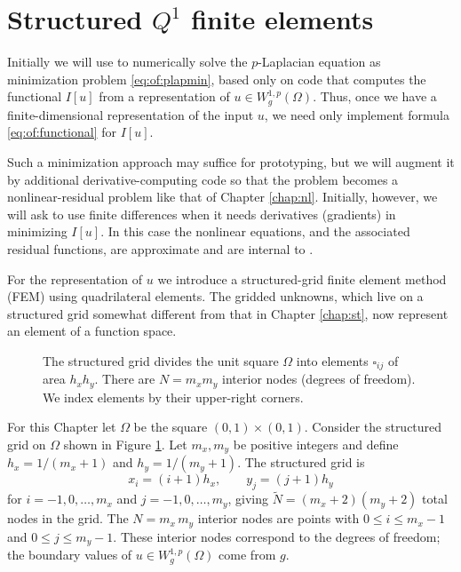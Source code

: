 \section{Structured $Q^1$ finite elements}

Initially we will use \PETSc to numerically solve the $p$-Laplacian equation as minimization problem \eqref{eq:of:plapmin}, based only on code that computes the functional $I[u]$ from a representation of $u \in W_g^{1,p}(\Omega)$.  Thus, once we have a finite-dimensional representation of the input $u$, we need only implement formula \eqref{eq:of:functional} for $I[u]$.

Such a minimization approach may suffice for prototyping, but we will augment it by additional derivative-computing code so that the problem becomes a nonlinear-residual problem like that of Chapter \ref{chap:nl}.  Initially, however, we will ask \PETSc to use finite differences when it needs derivatives (gradients) in minimizing $I[u]$.  In this case the nonlinear equations, and the associated residual functions, are approximate and are internal to \PETSc.

For the representation of $u$ we introduce a structured-grid finite element method (FEM) using quadrilateral elements.  The gridded unknowns, which live on a structured grid somewhat different from that in Chapter \ref{chap:st}, now represent an element of a function space.

\begin{figure}

\caption{The structured grid divides the unit square $\Omega$ into elements $\square_{ij}$ of area $h_x h_y$.  There are $N=m_x m_y$ interior nodes (degrees of freedom).  We index elements by their upper-right corners.}
\label{fig:of:q1grid}
\end{figure}

For this Chapter let $\Omega$ be the square $(0,1)\times (0,1)$.  Consider the structured grid on $\Omega$ shown in Figure \ref{fig:of:q1grid}.  Let $m_x,m_y$ be positive integers and define $h_x = 1/(m_x+1)$ and $h_y = 1/(m_y+1)$.  The structured grid is
\begin{equation}
x_i = (i+1) h_x, \qquad y_j = (j+1) h_y \label{eq:of:structuredgridindexing}
\end{equation}
for $i=-1,0,\dots,m_x$ and $j=-1,0,\dots,m_y$, giving $\tilde N = (m_x+2)(m_y+2)$ total nodes in the grid.  The $N=m_x\, m_y$ interior nodes are points with $0 \le i \le m_x-1$ and $0 \le j \le m_y-1$.  These interior nodes correspond to the degrees of freedom; the boundary values of $u\in W_g^{1,p}(\Omega)$ come from $g$. 


